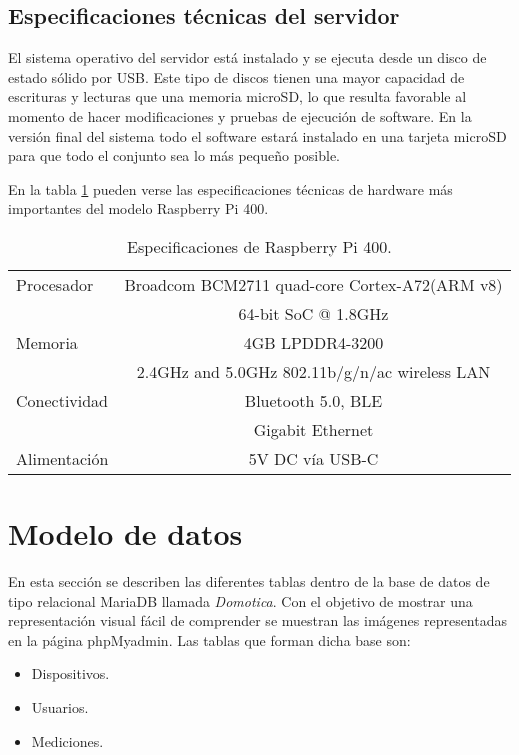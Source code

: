 \subsection{Especificaciones técnicas del servidor}

El sistema operativo del servidor está instalado y se ejecuta desde un disco de estado sólido por USB. Este tipo de discos tienen una mayor capacidad de escrituras y lecturas que una memoria microSD, lo que resulta favorable al momento de hacer modificaciones y pruebas de ejecución de software. En la versión final del sistema todo el software estará instalado en una tarjeta microSD para que todo el conjunto sea lo más pequeño posible.

En la tabla \ref{tab:Especificaciones Raspberry Pi 400} pueden verse las especificaciones técnicas de hardware más importantes del modelo Raspberry Pi 400.

\begin{table}[h]
\centering
\caption[Raspberry Pi 400]{Especificaciones de Raspberry Pi 400.}
\begin{tabular}{l c}
\toprule
Procesador		&	Broadcom BCM2711 quad-core Cortex-A72(ARM v8) \\
				&	64-bit SoC @ 1.8GHz \\
\midrule
Memoria			&	4GB LPDDR4-3200 \\
\midrule
				&	2.4GHz and 5.0GHz 802.11b/g/n/ac wireless LAN \\
Conectividad		&	Bluetooth 5.0, BLE\\
				&   Gigabit Ethernet \\
\midrule
Alimentación		&	5V DC vía USB-C\\
\bottomrule
\hline
\end{tabular}
\label{tab:Especificaciones Raspberry Pi 400}
\end{table}

\section{Modelo de datos}

En esta sección se describen las diferentes tablas dentro de la base de datos de tipo relacional MariaDB llamada \textit{Domotica}. Con el objetivo de mostrar una representación visual fácil de comprender se muestran las imágenes representadas en la página phpMyadmin. Las tablas que forman dicha base son:

\begin{itemize}
	\item Dispositivos.
	\item Usuarios.
	\item Mediciones.
\end{itemize}

